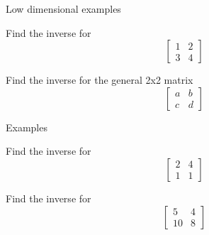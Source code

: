 \documentclass{beamer}
\begin{document}
\begin{frame}{Low dimensional examples}
  \begin{example}
    Find the inverse for
    \begin{equation*}
      \left[
        \begin{array}{cc}
          1&2\\
          3&4
        \end{array}
      \right]
    \end{equation*}
  \end{example}
  \begin{example}
    Find the inverse for the general 2x2 matrix
    \begin{equation*}
      \left[
        \begin{array}{cc}
          a&b\\
          c&d
        \end{array}
      \right]
    \end{equation*}
  \end{example}
\end{frame}

\begin{frame}{Examples}
  \begin{example}
    Find the inverse for
    \begin{equation*}
      \left[
        \begin{array}{cc}
          2&4\\
          1&1
        \end{array}
      \right]
    \end{equation*}
  \end{example}
  \begin{example}
    Find the inverse for
    \begin{equation*}
      \left[
        \begin{array}{cc}
          5&4\\
          10&8
        \end{array}
      \right]
    \end{equation*}
  \end{example}
\end{frame}
\end{document}
